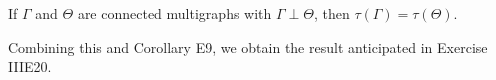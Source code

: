 If $\Gamma$ and $\Theta$ are connected multigraphs with $\Gamma \perp \Theta$, then $\tau(\Gamma) = \tau(\Theta)$.

Combining this and Corollary E9, we obtain the result anticipated in Exercise IIIE20.
